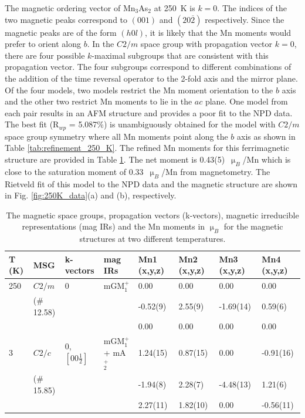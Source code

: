 \documentclass[10pt,doublespacing,edeposit]{uiucthesis2020}
\begin{document}
\begin{mainmatter}
The magnetic ordering vector of Mn$_3$As$_2$ at 250~K is $k = 0$. The indices of the two magnetic peaks correspond to $(001)$ and $(20\overline{2})$ respectively. Since the magnetic peaks are of the form $(h0l)$, it is likely that the Mn moments would prefer to orient along $b$. In the $C2/m$ space group with propagation vector $k=0$, there are four possible $k$-maximal subgroups that are consistent with this propagation vector. The four subgroups correspond to different combinations of the addition of the time reversal operator to the 2-fold axis and the mirror plane. 
Of the four models, two models restrict the Mn moment orientation to the $b$ axis and the other two restrict Mn moments to lie in the $ac$ plane. 
One model from each pair results in an AFM structure and provides a poor fit to the NPD data. 
The best fit (R$_{wp}$ = 5.087\%) is unambiguously obtained for the model with $C2/m$ space group symmetry where all Mn moments point along the $b$ axis as shown in Table \ref{tab:refinement_250_K}.
The refined Mn moments for this ferrimagnetic structure are provided in Table \ref{tab:Mn_moments}. The net moment is 0.43(5)~$\upmu_B$/Mn which is close to the saturation moment of 0.33~$\upmu_B$/Mn from magnetometry. The Rietveld fit of this model to the NPD data and the magnetic structure are shown in Fig. \ref{fig:250K_data}(a) and (b), respectively. 


\begin{table}
\caption{\label{tab:Mn_moments} 
The magnetic space groups, propagation vectors (k-vectors), magnetic irreducible representations (mag IRs) and the Mn moments in $\upmu_B$ for the magnetic structures at two different temperatures.
}
\centering
\begin{tabular}{p{1.5cm}p{2cm}p{2.2cm}p{2.6cm}p{2.15cm}p{2.15cm}p{2.15cm}p{2.15cm}}
\hline\hline
\textbf{T (K)} & \textbf{MSG} & \textbf{k-vectors} & \textbf{mag IRs} & \textbf{Mn1 (x,y,z)} & \textbf{Mn2 (x,y,z)} & \textbf{Mn3 (x,y,z)} & \textbf{Mn4 (x,y,z)}\\
\hline\hline
250 & $C2/m$ & 0 & mGM$_1^+$ & 0.00 & 0.00 & 0.00 & 0.00\\
& ($\#$12.58) & & & -0.52(9) & 2.55(9) & -1.69(14) & 0.59(6)\\
& & & & 0.00 & 0.00 & 0.00 & 0.00\\
\hline
3 & $C2/c$ & 0, $[00\frac{1}{2}]$ & mGM$_1^+$ + mA$_2^+$ & 1.24(15) & 0.87(15) & 0.00 & -0.91(16)\\
& ($\#$15.85) & & & -1.94(8) & 2.28(7) & -4.48(13) & 1.21(6)\\
& & & & 2.27(11) & 1.82(10) & 0.00 & -0.56(11)\\
\hline\hline
\end{tabular}
~\\
\end{table}


\end{mainmatter}
\end{document}

